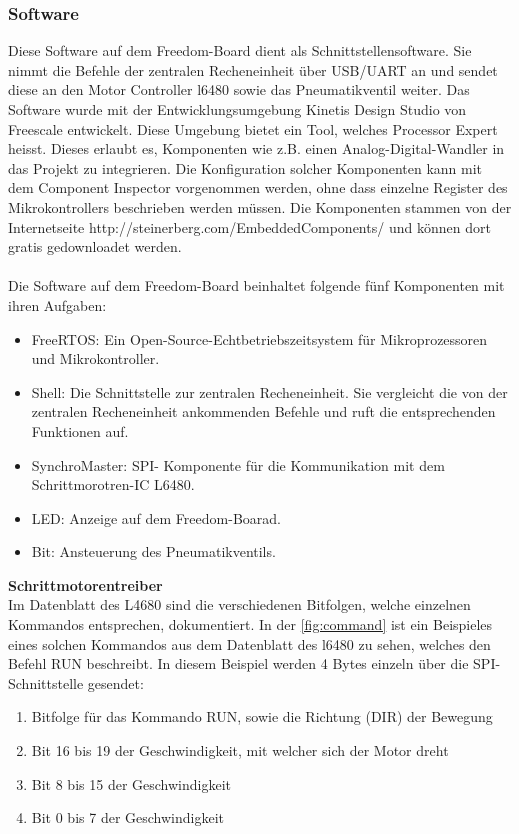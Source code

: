	\subsubsection{Software} \label{ch:Softwarea}
	\fi
	Diese Software auf dem Freedom-Board dient als Schnittstellensoftware. Sie nimmt die Befehle der zentralen Recheneinheit über USB/UART an und sendet diese an den Motor Controller l6480 sowie das Pneumatikventil weiter. Das Software wurde mit der Entwicklungsumgebung Kinetis Design Studio von Freescale entwickelt. Diese Umgebung bietet ein Tool, welches Processor Expert heisst. Dieses erlaubt es, Komponenten wie z.B. einen Analog-Digital-Wandler in das Projekt zu integrieren. Die Konfiguration solcher Komponenten kann mit dem Component Inspector vorgenommen werden, ohne dass einzelne Register des Mikrokontrollers beschrieben werden müssen. Die Komponenten stammen von der Internetseite http://steinerberg.com/EmbeddedComponents/ und können dort gratis gedownloadet werden.
	\\\\
	Die Software auf dem Freedom-Board beinhaltet folgende fünf Komponenten mit ihren Aufgaben: 
	\begin{itemize}
		\item FreeRTOS: 		Ein Open-Source-Echtbetriebszeitsystem für Mikroprozessoren und Mikrokontroller.  
		\item Shell: 			Die Schnittstelle zur zentralen Recheneinheit. Sie vergleicht die von der zentralen Recheneinheit ankommenden 
		Befehle und ruft die entsprechenden Funktionen auf. 
		\item SynchroMaster: 	SPI- Komponente für die Kommunikation mit dem Schrittmorotren-IC L6480. 
		\item LED: 				Anzeige auf dem Freedom-Boarad.
		\item Bit: 				Ansteuerung des Pneumatikventils.
	\end{itemize}
	\textbf{Schrittmotorentreiber}\\
	Im Datenblatt des L4680 sind die verschiedenen Bitfolgen, welche einzelnen Kommandos entsprechen, dokumentiert. In der \autoref{fig:command} ist ein Beispieles eines solchen Kommandos aus dem Datenblatt des l6480 zu sehen, welches den Befehl RUN beschreibt. In diesem Beispiel werden 4 Bytes einzeln über die SPI- Schnittstelle gesendet: 
	\begin{enumerate}
		\item Bitfolge für das Kommando RUN, sowie die Richtung (DIR) der Bewegung
		\item Bit 16 bis 19 der Geschwindigkeit, mit welcher sich der Motor dreht
		\item Bit 8 bis 15 der Geschwindigkeit
		\item Bit 0 bis 7 der Geschwindigkeit
	\end{enumerate}
